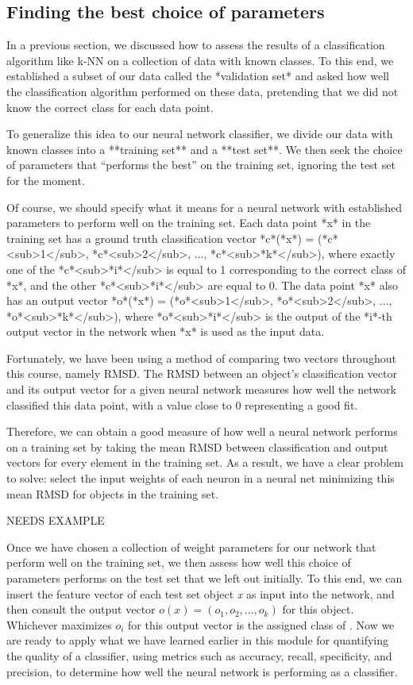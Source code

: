 \subsection{Finding the best choice of parameters}

In a previous section, we discussed how to assess the results of a classification algorithm like k-NN on a collection of data with known classes. To this end, we established a subset of our data called the *validation set* and asked how well the classification algorithm performed on these data, pretending that we did not know the correct class for each data point.

To generalize this idea to our neural network classifier, we divide our data with known classes into a **training set** and a **test set**. We then seek the choice of parameters that ``performs the best'' on the training set, ignoring the test set for the moment.

Of course, we should specify what it means for a neural network with established parameters to perform well on the training set. Each data point *x* in the training set has a ground truth classification vector *c*(*x*) = (*c*<sub>1</sub>, *c*<sub>2</sub>, ..., *c*<sub>*k*</sub>), where exactly one of the *c*<sub>*i*</sub> is equal to 1 corresponding to the correct class of *x*, and the other *c*<sub>*i*</sub> are equal to 0. The data point *x* also has an output vector *o*(*x*) = (*o*<sub>1</sub>, *o*<sub>2</sub>, ..., *o*<sub>*k*</sub>), where *o*<sub>*i*</sub> is the output of the *i*-th output vector in the network when *x* is used as the input data.

Fortunately, we have been using a method of comparing two vectors throughout this course, namely RMSD. The RMSD between an object's classification vector and its output vector for a given neural network measures how well the network classified this data point, with a value close to 0 representing a good fit.

Therefore, we can obtain a good measure of how well a neural network performs on a training set by taking the mean RMSD between classification and output vectors for every element in the training set. As a result, we have a clear problem to solve: select the input weights of each neuron in a neural net minimizing this mean RMSD for objects in the training set.

NEEDS EXAMPLE

Once we have chosen a collection of weight parameters for our network that perform well on the training set, we then assess how well this choice of parameters performs on the test set that we left out initially. To this end, we can insert the feature vector of each test set object \textit{x} as input into the network, and then consult the output vector $o(x) = (o_1, o_2, \ldots, o_k)$ for this object. Whichever  maximizes $o_i$ for this output vector is the assigned class of . Now we are ready to apply what we have learned earlier in this module for quantifying the quality of a classifier, using metrics such as accuracy, recall, specificity, and precision, to determine how well the neural network is performing as a classifier.

